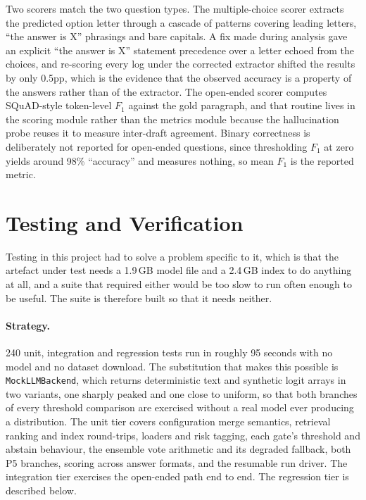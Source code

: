 Two scorers match the two question types. The multiple-choice scorer extracts
the predicted option letter through a cascade of patterns covering leading
letters, ``the answer is X'' phrasings and bare capitals. A fix made during
analysis gave an explicit ``the answer is X'' statement precedence over a
letter echoed from the choices, and re-scoring every log under the corrected
extractor shifted the results by only 0.5pp, which is the evidence that the
observed accuracy is a property of the answers rather than of the extractor.
The open-ended scorer computes SQuAD-style token-level $F_1$ against the gold
paragraph, and that routine lives in the scoring module rather than the
metrics module because the hallucination probe reuses it to measure
inter-draft agreement. Binary correctness is deliberately not reported for
open-ended questions, since thresholding $F_1$ at zero yields around 98\%
``accuracy'' and measures nothing, so mean $F_1$ is the reported metric.

\section{Testing and Verification}
\label{sec:impl-verification}

Testing in this project had to solve a problem specific to it, which is that
the artefact under test needs a 1.9\,GB model file and a 2.4\,GB index to do
anything at all, and a suite that required either would be too slow to run
often enough to be useful. The suite is therefore built so that it needs
neither.

\paragraph{Strategy.} 240 unit, integration and regression tests run in
roughly 95 seconds with no model and no dataset download. The substitution
that makes this possible is \texttt{MockLLMBackend}, which returns
deterministic text and synthetic logit arrays in two variants, one sharply
peaked and one close to uniform, so that both branches of every threshold
comparison are exercised without a real model ever producing a distribution.
The unit tier covers configuration merge semantics, retrieval ranking and
index round-trips, loaders and risk tagging, each gate's threshold and abstain
behaviour, the ensemble vote arithmetic and its degraded fallback, both P5
branches, scoring across answer formats, and the resumable run driver. The
integration tier exercises the open-ended path end to end. The regression tier
is described below.

